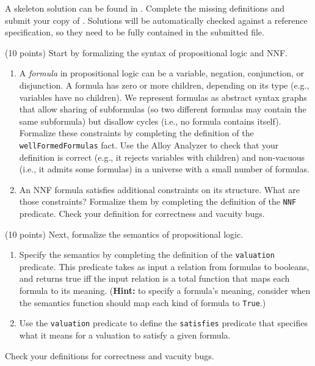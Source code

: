 \documentclass{handout}
\begin{document}
A skeleton solution can be found in .  Complete the missing
definitions and submit your copy of .  Solutions will be
automatically checked against a reference specification, so they need to be
fully contained in the submitted file.   


\begin{questions}
\item \label{prob:alloy:first} (10 points) Start by formalizing the syntax of propositional logic and NNF.
\begin{enumerate}
\item A \emph{formula} in propositional logic can be a variable, negation,
conjunction, or disjunction. A formula has zero or more children, depending on
its type (e.g., variables have no children).  We represent formulas as abstract
syntax graphs that allow sharing of subformulas (so two different formulas may
contain the same subformula) but disallow cycles (i.e., no formula contains
itself). Formalize these constraints by completing the definition of the
\texttt{wellFormedFormulas} fact. Use the Alloy Analyzer to check that your
definition is correct (e.g., it rejects variables with children) and non-vacuous
(i.e., it admits some formulas) in a universe with a small number of formulas. 

\item An NNF formula satisfies additional constraints on its structure.  What
are those constraints?     Formalize them by completing the definition of the
\texttt{NNF} predicate.  Check your definition for correctness and vacuity bugs.


\end{enumerate}

\item (10 points) Next, formalize the semantics of propositional logic.
\begin{enumerate}
\item Specify the semantics by completing the definition of the
\texttt{valuation} predicate. This predicate takes as input a relation from
formulas to booleans, and returns true iff the input relation is a total
function that maps each formula to its meaning. (\textbf{Hint:} to specify a
formula's meaning, consider when the semantics function should map each kind of
formula to \texttt{True}.)  

\item Use the \texttt{valuation} predicate to define the \texttt{satisfies}
predicate that specifies what it means for a valuation to satisfy a given
formula. 
\end{enumerate}
Check your definitions for correctness and vacuity bugs.



\end{questions}
\end{document}
